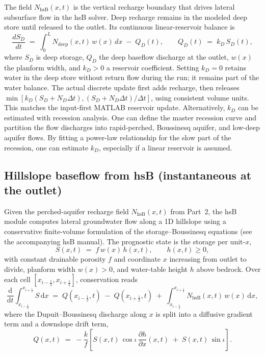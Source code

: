 \documentclass[12pt]{article}
\begin{document}
The field $N_{\text{hsB}}(x,t)$ is the vertical recharge boundary that drives lateral subsurface flow in the hsB solver. Deep recharge remains in the modeled deep store until released to the outlet. Its continuous linear-reservoir balance is
\begin{equation}
\frac{dS_D}{dt} \;=\; \int_0^{L} N_{\text{deep}}(x,t)\, w(x)\, dx \;-\; Q_D(t),
\qquad
Q_D(t) \;=\; k_D\, S_D(t),
\label{eq:deep}
\end{equation}
where $S_D$ is deep storage, $Q_D$ the deep baseflow discharge at the outlet, $w(x)$ the planform width, and $k_D>0$ a reservoir coefficient. Setting $k_D=0$ retains water in the deep store without return flow during the run; it remains part of the water balance. The actual discrete update first adds recharge, then releases $\min[k_D(S_D+N_D\Delta t), (S_D+N_D\Delta t)/\Delta t]$, using consistent volume units. This matches the input-first MATLAB reservoir update. Alternatively, $k_D$ can be estimated with recession analysis. One can define the master recession curve and partition the flow discharges into rapid-perched, Boussinesq aquifer, and low-deep aquifer flows. By fitting a power-law relationship for the slow part of the recession, one can estimate $k_D$, especially if a linear reservoir is assumed.

\subsection{Hillslope baseflow from hsB (instantaneous at the outlet)}

Given the perched-aquifer recharge field $N_{\text{hsB}}(x,t)$ from Part~2, the hsB module computes lateral groundwater flow along a 1D hillslope using a conservative finite-volume formulation of the storage--Boussinesq equations (see the accompanying hsB manual). The prognostic state is the storage per unit-$x$,
\begin{equation}
S(x,t) \;=\; f\,w(x)\,h(x,t), \qquad h(x,t)\ge 0,
\label{eq:hsb-state}
\end{equation}
with constant drainable porosity $f$ and coordinate $x$ increasing from outlet to divide, planform width $w(x)>0$, and water-table height $h$ above bedrock. Over each cell $[x_{i-\frac12},x_{i+\frac12}]$, conservation reads
\begin{equation}
\frac{\mathrm d}{\mathrm dt}\int_{x_{i-\frac12}}^{x_{i+\frac12}} S\,\mathrm dx
\;=\;
Q\!\left(x_{i-\frac12},t\right) \;-\; Q\!\left(x_{i+\frac12},t\right)
\;+\; \int_{x_{i-\frac12}}^{x_{i+\frac12}} N_{\text{hsB}}(x,t)\,w(x)\,\mathrm dx,
\label{eq:hsb-fv}
\end{equation}
where the Dupuit--Boussinesq discharge along $x$ is split into a diffusive gradient term and a downslope drift term,
\begin{equation}
Q(x,t) \;=\; -\frac{k}{f}
\left[
S(x,t)\,\cos\iota\,\frac{\partial h}{\partial x}(x,t)
\;+\; S(x,t)\,\sin\iota
\right].
\label{eq:hsb-flux}
\end{equation}
\end{document}
